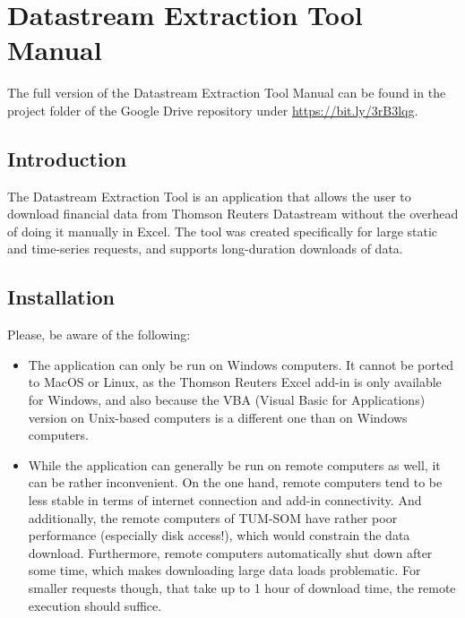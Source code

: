 \chapter{Datastream Extraction Tool Manual} \label{appendix-dset-manual}

The full version of the Datastream Extraction Tool Manual can be found in the project folder of the Google Drive repository under \url{https://bit.ly/3rB3lqg}. 

\section{Introduction}
The Datastream Extraction Tool is an application that allows the user to download financial data from Thomson Reuters Datastream without the overhead of doing it manually in Excel. The tool was created specifically for large static and time-series requests, and supports long-duration downloads of data. 

\section{Installation}
Please, be aware of the following: 
\begin{itemize}
	\item The application can only be run on Windows computers. It cannot be ported to MacOS or Linux, as the Thomson Reuters Excel add-in is only available for Windows, and also because the VBA (Visual Basic for Applications) version on Unix-based computers is a different one than on Windows computers. 
	\item While the application can generally be run on remote computers as well, it can be rather inconvenient. On the one hand, remote computers tend to be less stable in terms of internet connection and add-in connectivity. And additionally, the remote computers of TUM-SOM have rather poor performance (especially disk access!), which would constrain the data download. Furthermore, remote computers automatically shut down after some time, which makes downloading large data loads problematic. For smaller requests though, that take up to 1 hour of download time, the remote execution should suffice. 
\end{itemize}

